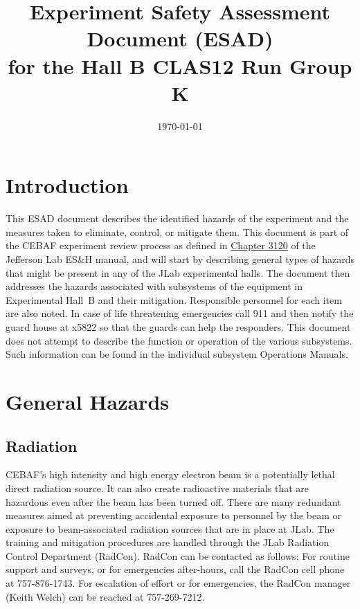 \documentclass[12pt]{report}
\begin{document}
\title{Experiment Safety Assessment Document (ESAD) \\ 
for the Hall B CLAS12 Run Group K}
\date{\today}
%
%
%
\maketitle
\tableofcontents

\chapter{Introduction}

This ESAD document describes the identified hazards of the experiment and the measures 
taken to eliminate, control, or mitigate them. This document is part of the CEBAF 
experiment review process as defined in
\href{http://www.jlab.org/ehs/ehsmanual/manual/3120.html}{Chapter 3120} of the Jefferson 
Lab ES\&H manual, and will start by describing general types of hazards that might be 
present in any of the JLab experimental halls.  The document then addresses the hazards 
associated with subsystems of the equipment in Experimental Hall~B and their mitigation.  
Responsible personnel for each item are also noted. In case of life threatening emergencies 
call 911 and then notify the guard house at x5822 so that the guards can help the 
responders.  This document does not attempt to describe the function or operation of the 
various subsystems. Such information can be found in the individual subsystem Operations 
Manuals.

\chapter{General Hazards}

\section{Radiation}
	
CEBAF's high intensity and high energy electron beam is a potentially lethal direct 
radiation source. It can also create radioactive materials that are hazardous even after 
the beam has been turned off. There are many redundant measures aimed at preventing 
accidental exposure to personnel by the beam or exposure to beam-associated radiation 
sources that are in place at JLab. The training and mitigation procedures are handled 
through the JLab Radiation Control Department (RadCon). RadCon can be contacted as follows: 
For routine support and surveys, or for emergencies after-hours, call the RadCon cell phone 
at 757-876-1743. For escalation of effort or for emergencies, the RadCon manager (Keith Welch) 
can be reached at 757-269-7212.
\end{document}
